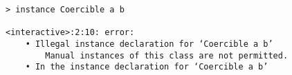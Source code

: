 \begin{repl}\begin{lstlisting}
> instance Coercible a b

<interactive>:2:10: error:
    • Illegal instance declaration for ‘Coercible a b’
        Manual instances of this class are not permitted.
    • In the instance declaration for ‘Coercible a b’\end{lstlisting}\end{repl}
